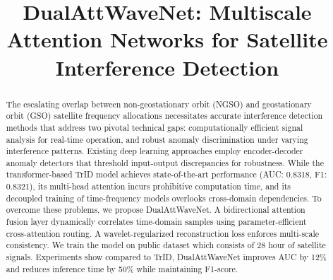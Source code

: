 \documentclass[conference]{IEEEtran}
\begin{document}
\title{DualAttWaveNet: Multiscale Attention Networks for Satellite Interference Detection}

\author{
}




\maketitle

\begin{abstract}
    The escalating overlap between non-geostationary orbit (NGSO) and geostationary orbit (GSO) satellite frequency allocations necessitates accurate interference detection methods that address two pivotal technical gaps: computationally efficient signal analysis for real-time operation, and robust anomaly discrimination under varying interference patterns.  Existing deep learning approaches employ encoder-decoder anomaly detectors that threshold input-output discrepancies for robustness. While the transformer-based TrID model achieves state-of-the-art performance (AUC: 0.8318, F1: 0.8321), its multi-head attention incurs prohibitive computation time, and its decoupled training of time-frequency models overlooks cross-domain dependencies. To overcome these problems, we propose DualAttWaveNet. A bidirectional attention fusion layer dynamically correlates time-domain samples using parameter-efficient cross-attention routing. A wavelet-regularized reconstruction loss enforces multi-scale consistency.  We train the model on public dataset which consists of 28 hour of satellite signals. Experiments show compared to TrID, DualAttWaveNet improves AUC by 12\% and reduces inference time by 50\% while maintaining F1-score.


\end{abstract}
\end{document}
